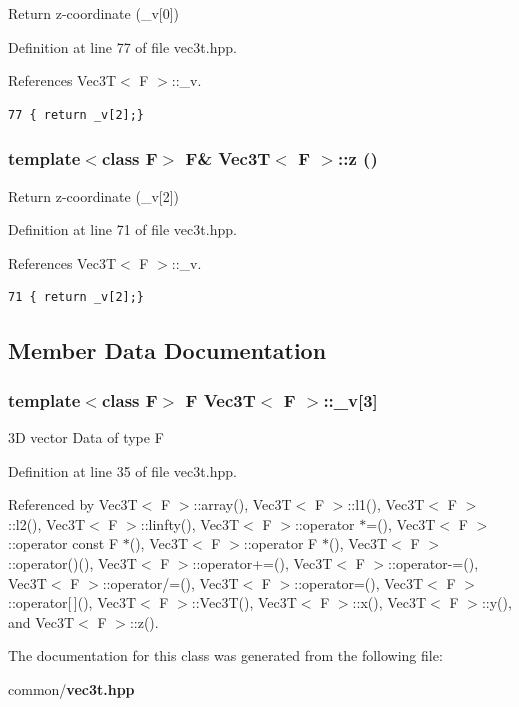 Return z-coordinate (\_\-v[0]) 

Definition at line 77 of file vec3t.hpp.

References Vec3T$<$ F $>$::\_\-v.

\footnotesize\begin{verbatim}77 { return _v[2];}
\end{verbatim}\normalsize 


\subsubsection{\setlength{\rightskip}{0pt plus 5cm}template$<$class F$>$ F\& {\bf Vec3T}$<$ F $>$::z ()\hspace{0.3cm}{\tt  [inline]}}\label{classVec3T_622f286353494846ff04e74cb10312e6_622f286353494846ff04e74cb10312e6}


Return z-coordinate (\_\-v[2]) 

Definition at line 71 of file vec3t.hpp.

References Vec3T$<$ F $>$::\_\-v.

\footnotesize\begin{verbatim}71 { return _v[2];}
\end{verbatim}\normalsize 




\subsection{Member Data Documentation}
\subsubsection{\setlength{\rightskip}{0pt plus 5cm}template$<$class F$>$ F {\bf Vec3T}$<$ F $>$::{\bf \_\-v}[3]\hspace{0.3cm}{\tt  [private]}}\label{classVec3T_c87fbb402bd1742760b8dc179a0a17f3_c87fbb402bd1742760b8dc179a0a17f3}


3D vector Data of type F 

Definition at line 35 of file vec3t.hpp.

Referenced by Vec3T$<$ F $>$::array(), Vec3T$<$ F $>$::l1(), Vec3T$<$ F $>$::l2(), Vec3T$<$ F $>$::linfty(), Vec3T$<$ F $>$::operator $\ast$=(), Vec3T$<$ F $>$::operator const F $\ast$(), Vec3T$<$ F $>$::operator F $\ast$(), Vec3T$<$ F $>$::operator()(), Vec3T$<$ F $>$::operator+=(), Vec3T$<$ F $>$::operator-=(), Vec3T$<$ F $>$::operator/=(), Vec3T$<$ F $>$::operator=(), Vec3T$<$ F $>$::operator[$\,$](), Vec3T$<$ F $>$::Vec3T(), Vec3T$<$ F $>$::x(), Vec3T$<$ F $>$::y(), and Vec3T$<$ F $>$::z().

The documentation for this class was generated from the following file:\begin{CompactItemize}
\item 
common/{\bf vec3t.hpp}\end{CompactItemize}
